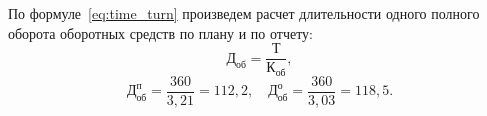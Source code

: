 По формуле~\ref{eq:time_turn} произведем расчет длительности одного полного оборота
оборотных средств по плану и по отчету:
\begin{equation}
\label{eq:time_turn}
\text{Д}_\text{об} = \dfrac{\text{Т}}{\text{К}_\text{об}},
\end{equation}
\vspace{-1.8cm}
\begin{equation*}
\text{Д}^\text{п}_\text{об} = \dfrac{360}{3{,}21} = 112{,}2, \quad
\text{Д}^\text{о}_\text{об} = \dfrac{360}{3{,}03} = 118{,}5. 
\end{equation*}

\newpage
